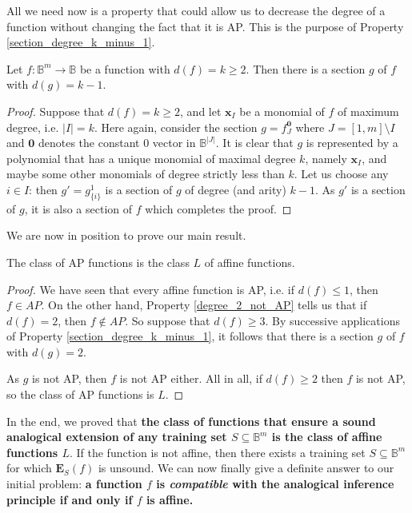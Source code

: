 All we need now is a property that could allow us to decrease the degree of a
function without changing the fact that it is AP. This is the purpose of
Property \ref{section_degree_k_minus_1}.

\begin{property}\label{section_degree_k_minus_1}
Let $f:\mathbb{B}^m\rightarrow \mathbb{B}$ be a function with
  $d(f)=k\geq 2$. Then there is a section $g$ of $f$ with $d(g)=k-1$.
\end{property}
\begin{proof}
Suppose that  $d(f)=k\geq 2$, and let $\mathbf{x}_I$ be a monomial of $f$ of
  maximum degree, i.e. $|I|=k$.  Here again, consider the section $g =
  f^{\mathbf{0}}_J$ where $J = [1, m] \setminus I$ and $\mathbf{0}$ denotes the
  constant $0$ vector in $\mathbb{B}^{|J|}$. It is clear that $g$ is
  represented by a  polynomial that has a unique monomial of maximal degree
  $k$, namely $\mathbf{x}_I$, and maybe some other monomials of degree strictly
  less than $k$.  Let us choose any $i \in I$: then $g' = g^1_{\{i\}}$ is a
  section of $g$ of degree (and arity) $k-1$. As $g'$ is a section of $g$, it
  is also a section of $f$ which completes the proof.
\end{proof}

We are now in position to prove our main result.

\begin{proposition}
  \label{PROPOS:AP_is_L}
The class of AP functions is the class $L$ of affine functions.
\end{proposition}
\begin{proof}
We have seen that every affine function is AP, i.e. if $d(f)\leq 1$, then $f\in
  AP$. On the other hand, Property \ref{degree_2_not_AP} tells us that if
  $d(f)=2$, then $f \notin AP$. So suppose that  $d(f)\geq 3$. By successive
  applications of Property \ref{section_degree_k_minus_1}, it follows that
  there is a section $g$ of $f$ with $d(g)=2$.

  As $g$ is not AP, then $f$ is not AP either. All in all, if $d(f) \geq 2$
  then $f$ is not AP, so the class of AP functions is $L$.
\end{proof}

In the end, we proved that {\bf the class of functions that ensure a sound
analogical extension of any training set $S \subseteq \mathbb{B}^m$ is the class
of affine functions $L$}. If the function is not affine, then there exists a
training set $S \subseteq \mathbb{B}^m$ for which $\mathbf{E}_S(f)$ is unsound.
We can now finally give a definite answer to our initial problem: \textbf{a
function $f$ is \textit{compatible} with the analogical inference principle if
and only if $f$ is affine.}

